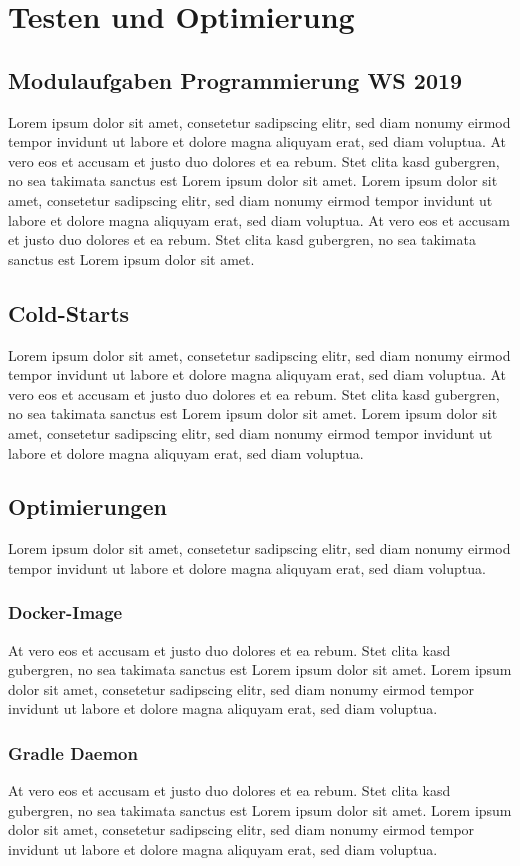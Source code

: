 \chapter{Testen und Optimierung}

\section{Modulaufgaben Programmierung WS 2019}
Lorem ipsum dolor sit amet, consetetur sadipscing elitr,
sed diam nonumy eirmod tempor invidunt ut labore et dolore magna
aliquyam erat, sed diam voluptua.
At vero eos et accusam et justo duo dolores et ea rebum. Stet clita kasd gubergren,
no sea takimata sanctus est Lorem ipsum dolor sit amet. Lorem ipsum dolor sit amet,
consetetur sadipscing elitr, sed diam nonumy eirmod tempor invidunt ut labore et
dolore magna aliquyam erat, sed diam voluptua.
At vero eos et accusam et justo duo dolores et ea rebum.
Stet clita kasd gubergren, no sea takimata sanctus est Lorem ipsum dolor sit amet.

\section{Cold-Starts}
Lorem ipsum dolor sit amet, consetetur sadipscing elitr,
sed diam nonumy eirmod tempor invidunt ut labore et dolore magna
aliquyam erat, sed diam voluptua.
At vero eos et accusam et justo duo dolores et ea rebum. Stet clita kasd gubergren,
no sea takimata sanctus est Lorem ipsum dolor sit amet. Lorem ipsum dolor sit amet,
consetetur sadipscing elitr, sed diam nonumy eirmod tempor invidunt ut labore et
dolore magna aliquyam erat, sed diam voluptua.

\section{Optimierungen}
Lorem ipsum dolor sit amet, consetetur sadipscing elitr,
sed diam nonumy eirmod tempor invidunt ut labore et dolore magna
aliquyam erat, sed diam voluptua.
\subsection{Docker-Image}
At vero eos et accusam et justo duo dolores et ea rebum. Stet clita kasd gubergren,
no sea takimata sanctus est Lorem ipsum dolor sit amet. Lorem ipsum dolor sit amet,
consetetur sadipscing elitr, sed diam nonumy eirmod tempor invidunt ut labore et
dolore magna aliquyam erat, sed diam voluptua.
\subsection{Gradle Daemon}
At vero eos et accusam et justo duo dolores et ea rebum. Stet clita kasd gubergren,
no sea takimata sanctus est Lorem ipsum dolor sit amet. Lorem ipsum dolor sit amet,
consetetur sadipscing elitr, sed diam nonumy eirmod tempor invidunt ut labore et
dolore magna aliquyam erat, sed diam voluptua.
